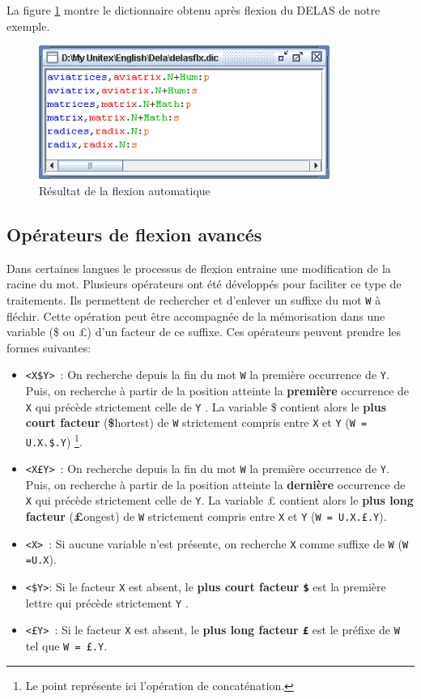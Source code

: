 \bigskip
\noindent La figure \ref{fig-inflection-result} montre le dictionnaire obtenu après flexion du DELAS de notre exemple.

\bigskip
\begin{figure}[!ht]
\begin{center}
\includegraphics[width=9.5cm]{resources/img/fig3-9.png}
\caption{Résultat de la flexion automatique\label{fig-inflection-result}}
\end{center}
\end{figure}
\bigskip

\subsection{Opérateurs de flexion avancés}
\label{advanced-inflection-operators}
Dans certaines langues le processus de flexion entraine une modification de la racine du mot.
Plusieurs opérateurs ont été développés pour faciliter ce type de traitements. Ils permettent de rechercher
et d'enlever un suffixe du mot \verb+W+ \`a fléchir. Cette opération peut
\^etre accompagnée de la mémorisation dans une variable (\$ ou \pounds) d'un facteur de ce suffixe.
Ces opérateurs peuvent prendre les formes suivantes:

\bigskip
\begin{itemize}
\item \verb+<X$Y>+~: On recherche depuis la fin du mot \verb+W+ la première occurrence de \verb+Y+.
Puis, on recherche \`a partir de la position atteinte la {\bf première} occurrence de \verb+X+ qui
précède strictement celle de \verb+Y+ . La variable \$ contient alors le {\bf plus court facteur}
({\bf\$}hortest) de \verb+W+ strictement compris entre \verb+X+ et \verb+Y+ (\verb+W = U.X.$.Y+) \footnote{Le point
représente ici l'opération de concaténation.}.
\item \verb+<X£Y>+~: On recherche depuis la fin du mot \verb+W+ la première occurrence de \verb+Y+.
Puis, on recherche \`a partir de la position atteinte la {\bf dernière} occurrence de \verb+X+ qui
précède strictement celle de \verb+Y+. La variable {\pounds} contient alors le {\bf plus long facteur}
({\bf£}ongest) de \verb+W+ strictement compris entre \verb+X+ et \verb+Y+ (\verb+W = U.X.£.Y+).
\item \verb+<X>+~: Si aucune variable n'est présente, on recherche \verb+X+ comme suffixe de \verb+W+
	(\verb+W =U.X+).
\item \verb+<$Y>+: Si le facteur \verb+X+ est absent, le {\bf plus court facteur \verb+$+} est la première lettre
	qui précède strictement \verb+Y+ .
\item \verb+<£Y>+~: Si le facteur \verb+X+ est absent, le {\bf plus long facteur \verb+£+} est le préfixe de
	\verb+W+ tel que  \verb+W = £.Y+.
\end{itemize}

